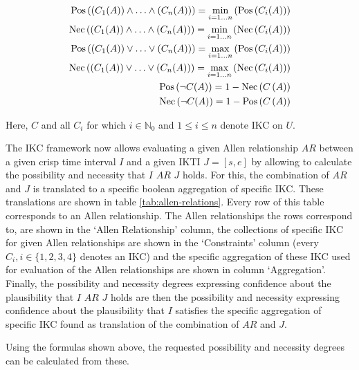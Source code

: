 \begin{align}
\operatorname{Pos}\left(\left(C_1(A)\right) \wedge \ldots \wedge \left(C_n(A)\right)\right) = \min_{i=1 \ldots n} \left(\operatorname{Pos}\left(C_i(A)\right)\right) \nonumber \\
\operatorname{Nec}\left(\left(C_1(A)\right) \wedge \ldots \wedge \left(C_n(A)\right)\right) = \min_{i=1 \ldots n} \left(\operatorname{Nec}\left(C_i(A)\right)\right) \nonumber \\
\operatorname{Pos}\left(\left(C_1(A)\right) \vee \ldots \vee \left(C_n(A)\right)\right) = \max_{i=1 \ldots n} \left(\operatorname{Pos}\left(C_i(A)\right)\right) \nonumber \\
\operatorname{Nec}\left(\left(C_1(A)\right) \vee \ldots \vee \left(C_n(A)\right)\right) = \max_{i=1 \ldots n} \left(\operatorname{Nec}\left(C_i(A)\right)\right) \nonumber \\
\operatorname{Pos}\left(\neg C(A)\right) = 1 - \operatorname{Nec}\left(C\left(A\right)\right) \nonumber \\
\operatorname{Nec}\left(\neg C(A)\right) = 1 - \operatorname{Pos}\left(C\left(A\right)\right) \nonumber
\end{align}

Here, $C$ and all $C_i$ for which $i \in \mathbb{N}_0$ and $1 \leq i \leq n$ denote IKC on $U$.

The IKC framework now allows evaluating a given Allen relationship $AR$ between a given crisp time interval $I$ and a given IKTI $J = \left[s, e\right]$ by allowing to calculate the possibility and necessity that $I$ $AR$ $J$ holds. For this, the combination of $AR$ and $J$ is translated to a specific boolean aggregation of specific IKC. These translations are shown in table \ref{tab:allen-relations}. Every row of this table corresponds to an Allen relationship. The Allen relationships the rows correspond to, are shown in the `Allen Relationship' column, the collections of specific IKC for given Allen relationships are shown in the `Constraints' column (every $C_i, i \in \{1, 2, 3, 4\}$ denotes an IKC) and the specific aggregation of these IKC used for evaluation of the Allen relationships are shown in column `Aggregation'. Finally, the possibility and necessity degrees expressing confidence about the plausibility that $I$ $AR$ $J$ holds are then the possibility and necessity expressing confidence about the plausibility that $I$ satisfies the specific aggregation of specific IKC found as translation of the combination of $AR$ and $J$.


Using the formulas shown above, the requested possibility and necessity degrees can be calculated from these.


